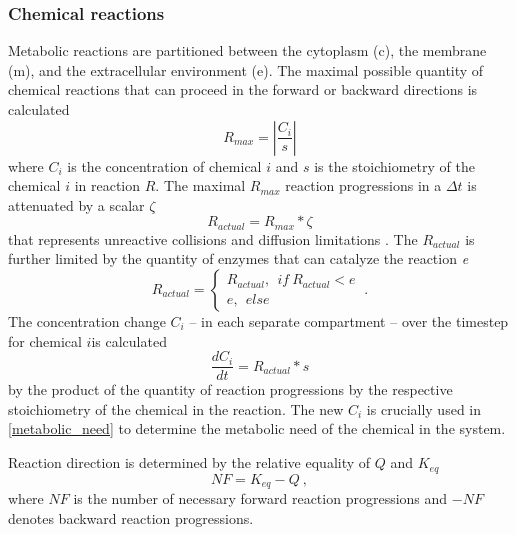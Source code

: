 \begin{supplementary}
\subsubsection{Chemical reactions}

Metabolic reactions are partitioned between the cytoplasm (c), the membrane (m), and the extracellular environment (e). The maximal possible quantity of chemical reactions that can proceed in the forward or backward directions is calculated 
\begin{equation}
    R_{max}=\left|\frac{C_i}{s}\right| 
\end{equation}
where $C_i$ is the concentration of chemical $i$ and $s$ is the stoichiometry of the chemical $i$ in reaction $R$. The maximal $R_{max}$ reaction progressions in a $\Delta t$ is attenuated by a scalar $\zeta$ 
\begin{equation}
    R_{actual}=R_{max}*\zeta
\end{equation}
that represents unreactive collisions and diffusion limitations \cite{Feynman1963ChapterDiffusion}. The $R_{actual}$ is further limited by the quantity of enzymes that can catalyze the reaction \textit{e}
\begin{equation}
    R_{actual} = \begin{cases}
            R_{actual},~~if~R_{actual}<e \\
            e,~~else
            \end{cases}~.
\end{equation}
The concentration change $C_i$ -- in each separate compartment -- over the timestep for chemical $i$is calculated
\begin{equation}
    \frac{dC_i}{dt}=R_{actual}*s
\end{equation}
by the product of the quantity of reaction progressions by the respective stoichiometry of the chemical in the reaction. The new $C_i$ is crucially used in \cref{metabolic_need} to determine the metabolic need of the chemical in the system. 

Reaction direction is determined by the relative equality of $Q$ and $K_{eq}$
\begin{equation}
    NF = K_{eq}-Q~,        
\end{equation}
where $NF$ is the number of necessary forward reaction progressions and $-NF$ denotes backward reaction progressions. 

\end{supplementary}